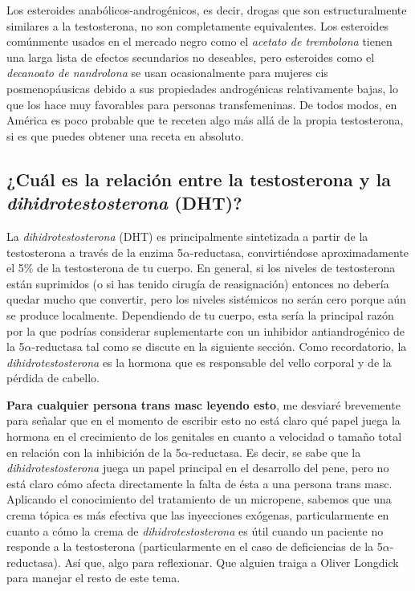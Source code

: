 \documentclass{article}
\begin{document}
Los esteroides anabólicos-androgénicos, es decir, drogas que son estructuralmente similares a la testosterona, no son completamente equivalentes. Los esteroides comúnmente usados en el mercado negro como el \textit{acetato de trembolona} tienen una larga lista de efectos secundarios no deseables, pero esteroides como el \textit{decanoato de nandrolona} se usan ocasionalmente para mujeres cis posmenopáusicas debido a sus propiedades androgénicas relativamente bajas, lo que los hace muy favorables para personas transfemeninas. De todos modos, en América es poco probable que te receten algo más allá de la propia testosterona, si es que puedes obtener una receta en absoluto.

\subsection{¿Cuál es la relación entre la testosterona y la \textit{dihidrotestosterona} (DHT)?}

La \textit{dihidrotestosterona} (DHT) es principalmente sintetizada a partir de la testosterona a través de la enzima 5$\alpha$-reductasa, convirtiéndose aproximadamente el 5\% de la testosterona de tu cuerpo. En general, si los niveles de testosterona están suprimidos (o si has tenido cirugía de reasignación) entonces no debería quedar mucho que convertir, pero los niveles sistémicos no serán cero porque aún se produce localmente. Dependiendo de tu cuerpo, esta sería la principal razón por la que podrías considerar suplementarte con un inhibidor antiandrogénico de la 5$\alpha$-reductasa tal como se discute en la siguiente sección. Como recordatorio, la \textit{dihidrotestosterona} es la hormona que es responsable del vello corporal y de la pérdida de cabello.

\textbf{Para cualquier persona trans masc leyendo esto}, me desviaré brevemente para señalar que en el momento de escribir esto no está claro qué papel juega la hormona en el crecimiento de los genitales en cuanto a velocidad o tamaño total en relación con la inhibición de la 5$\alpha$-reductasa. Es decir, se sabe que la \textit{dihidrotestosterona} juega un papel principal en el desarrollo del pene, pero no está claro cómo afecta directamente la falta de ésta a una persona trans masc. Aplicando el conocimiento del tratamiento de un micropene, sabemos que una crema tópica es más efectiva que las inyecciones exógenas, particularmente en cuanto a cómo la crema de \textit{dihidrotestosterona} es útil cuando un paciente no responde a la testosterona (particularmente en el caso de deficiencias de la 5$\alpha$-reductasa). Así que, algo para reflexionar. Que alguien traiga a Oliver Longdick para manejar el resto de este tema.
\end{document}
